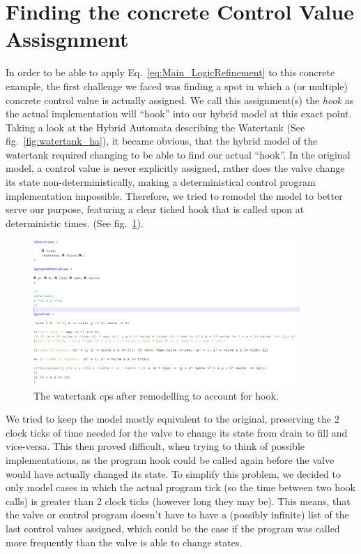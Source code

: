 \section{Finding the concrete Control Value Assisgnment}
\label{sec:Watertank:ControlValue}

In order to be able to apply Eq.~\ref{eq:Main_LogicRefinement} to this concrete example, the first challenge we faced was finding a spot in which a (or multiple) concrete control value is actually assigned. We call this assignment(s) the \textit{hook} as the actual implementation will ``hook'' into our hybrid model at this exact point. Taking a look at the Hybrid Automata describing the Watertank (See fig.~\ref{fig:watertank_ha}), it became obvious, that the hybrid model of the watertank required changing to be able to find our actual ``hook''. In the original model, a control value is never explicitly assigned, rather does the valve change its state non-deterministically, making a deterministical control program implementation impossible. Therefore, we tried to remodel the model to better serve our purpose, featuring a clear ticked hook that is called upon at deterministic times. (See fig.~\ref{fig:watertank_hp_ref}).

\begin{figure}
	\centering
	\includegraphics[width=0.9\textwidth]{images/watertank_hp_ref}
	\caption{The watertank cps after remodelling to account for hook.}
	\label{fig:watertank_hp_ref}
\end{figure}

We tried to keep the model mostly equivalent to the original, preserving the 2 clock ticks of time needed for the valve to change its state from drain to fill and vice-versa. This then proved difficult, when trying to think of possible implementations, as the program hook could be called again before the valve would have actually changed its state. To simplify this problem, we decided to only model cases in which the actual program tick (so the time between two hook calls)  is greater than 2 clock ticks (however long they may be).  This means, that the valve or control program doesn't have to have a (possibly infinite) list of the last control values assigned, which could be the case if the program was called more frequently than the valve is able to change states.

